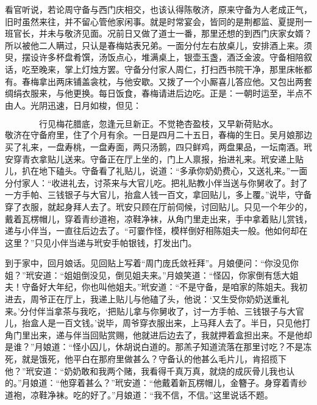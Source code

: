 看官听说，若论周守备与西门庆相交，也该认得陈敬济，原来守备为人老成正气，旧时虽然来往，并不留心管他家闲事。就是时常宴会，皆同的是荆都监、夏提刑一班官长，并未与敬济见面。况前日又做了道士一番，那里还想的到西门庆家女婿？所以被他二人瞒过，只认是春梅姑表兄弟。一面分付左右放桌儿，安排酒上来。须臾，摆设许多杯盘肴馔，汤饭点心，堆满桌上，银壶玉盏，酒泛金波。守备相陪叙话，吃至晚来，掌上灯烛方罢。守备分付家人周仁，打扫西书院干净，那里床帐都有。春梅拿出两床铺盖衾枕，与他安歇。又拨了一个小厮喜儿答应他。又包出两套绸绢衣服来，与他更换。每日饭食，春梅请进后边吃。正是：一朝时运至，半点不由人。光阴迅速，日月如梭，但见：

\[
行见梅花腊底，忽逢元旦新正。
不觉艳杏盈枝，又早新荷贴水。
\]
敬济在守备府里，住了个月有余。一日是四月二十五日，春梅的生日。吴月娘那边买了礼来，一盘寿桃，一盘寿面，两只汤鹅，四只鲜鸡，两盘果品，一坛南酒。玳安穿青衣拿贴儿送来。守备正在厅上坐的，门上人禀报，抬进礼来。玳安递上贴儿，扒在地下磕头。守备看了礼贴儿，说道：“多承你奶奶费心，又送礼来。”一面分付家人：“收进礼去，讨茶来与大官儿吃。把礼贴教小伴当送与你舅收了。封了一方手帕、三钱银子与大官儿，抬盒人钱一百文，拿回贴儿，多上覆。”说毕，守备穿了衣服，就起身拜人去了。玳安只顾在厅前伺候，讨回贴儿。只见一个年少的，戴着瓦楞帽儿，穿着青纱道袍，凉鞋净袜，从角门里走出来，手中拿着贴儿赏钱，递与小伴当，一直往后边去了。“可霎作怪，模样倒好相陈姐夫一般。他如何却在这里？”只见小伴当递与玳安手帕银钱，打发出门。

到于家中，回月娘话。见回贴上写着“周门庞氏敛衽拜”。月娘便问：“你没见你姐？”玳安道：“姐姐倒没见，倒见姐夫来。”月娘笑道：“怪囚，你家倒有恁大姐夫！守备好大年纪，你也叫他姐夫。”玳安道：“不是守备，是咱家的陈姐夫。我初进去，周爷正在厅上，我递上贴儿与他磕了头，他说：‘又生受你奶奶送重礼来。’分付伴当拿茶与我吃，‘把贴儿拿与你舅收了，讨一方手帕、三钱银子与大官儿，抬盒人是一百文钱。’说毕，周爷穿衣服出来，上马拜人去了。半日，只见他打角门里出来，递与伴当回贴赏赐，他就进后边去了，我就押着盒担出来。不是他却是谁？”月娘道：“怪小囚儿，休胡说白道的。那羔子知道流落在那里讨吃？不是冻死，就是饿死，他平白在那府里做甚么？守备认的他甚么毛片儿，肯招揽下他？”玳安道：“奶奶敢和我两个赌，我看得千真万真，就烧的成灰骨儿我也认的。”月娘道：“他穿着甚么？”玳安道：“他戴着新瓦楞帽儿，金簪子。身穿着青纱道袍，凉鞋净袜。吃的好了。”月娘道：“我不信，不信。”这里说话不题。

